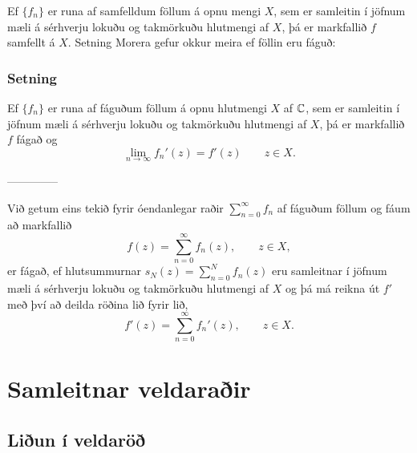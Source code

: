 Ef $\{f_n\}$ er runa af samfelldum föllum á opnu mengi $X$, sem er
samleitin í jöfnum mæli á sérhverju lokuðu og takmörkuðu hlutmengi af
$X$, þá er  markfallið $f$ samfellt
á $X$.   Setning Morera gefur okkur meira ef föllin eru fáguð:

\subsubsection{Setning}
Ef $\{f_n\}$ er runa af fáguðum föllum á opnu hlutmengi $X$ af
${\mathbb C}$, sem er samleitin í jöfnum mæli á sérhverju lokuðu og takmörkuðu
hlutmengi af $X$, þá er markfallið $f$ fágað og 
$$
\lim_{n\to \infty} f_n'(z)=f'(z)\qquad z\in X.
$$

--------------



\smallskip

Við getum eins tekið fyrir óendanlegar raðir $\sum_{n=0}^\infty f_n$
af fáguðum föllum og fáum að markfallið
 $$f(z) = \sum_{n=0}^\infty f_n(z), \qquad z\in X,
 $$
er fágað, ef hlutsummurnar $s_N(z)=\sum_{n=0}^N f_n(z)$ eru samleitnar í jöfnum
mæli á sérhverju lokuðu og takmörkuðu hlutmengi af $X$ og þá má reikna
út $f'$ með því að deilda röðina lið fyrir lið,
 $$f'(z) = \sum_{n=0}^\infty f_n'(z), \qquad z\in X.
 $$


\section{Samleitnar veldaraðir}  


\subsection*{Liðun í veldaröð}

